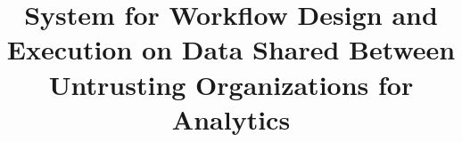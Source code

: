 \documentclass[11pt,oneside]{book}
\title{System for Workflow Design and Execution on Data Shared Between Untrusting Organizations for Analytics}
\begin{document}
\begin{titlepage}

\end{titlepage}
\frontmatter
\pagestyle{empty}
\declaration




\tableofcontents

% 
% 

\mainmatter	  %










\listoffigures
\lstlistoflistings

\appendix


\printbibliography
\uisbackcover
\end{document}
